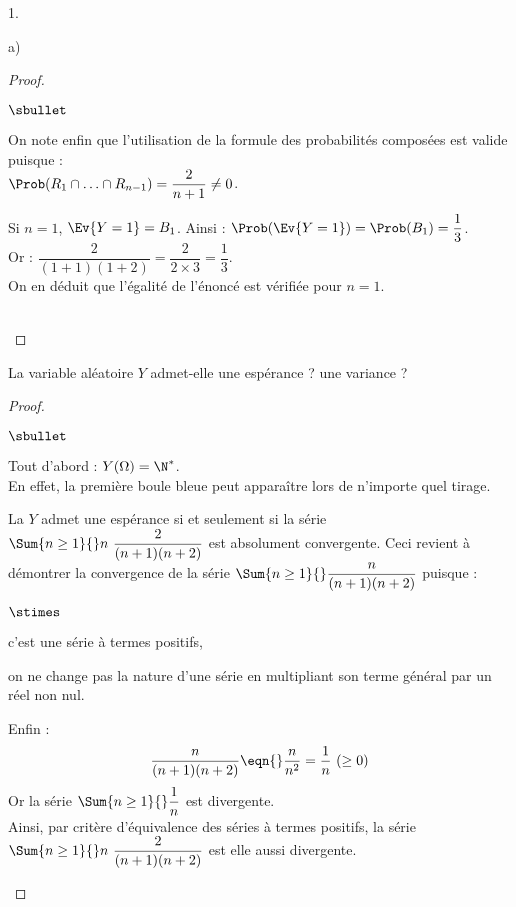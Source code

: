 \begin{noliste}{1.}
\begin{noliste}{a)}
\begin{proof}
\begin{noliste}{$\sbullet$}
      \item On note enfin que l'utilisation de la formule des
        probabilités composées est valide puisque : \\[.1cm]
        $\Prob(R_1 \cap
        \ldots \cap R_{n-1}) = \dfrac{2}{n+1} \neq 0$.
        
       \item Si $n = 1$, $\Ev{Y = 1} = B_1$. Ainsi : $\Prob(\Ev{Y = 1})
        = \Prob(B_1) = \dfrac{1}{3}$.\\
        Or : $\dfrac{2}{(1+1)(1+2)} = \dfrac{2}{2 \times 3} =
        \dfrac{1}{3}$.\\[.2cm]
        On en déduit que l'égalité de l'énoncé est vérifiée pour $n =
        1$.
      \end{noliste}
      ~\\[-1cm]
    \end{proof}


    \newpage


  \item La variable aléatoire $Y$ admet-elle une espérance ? une
    variance ?
    
    \begin{proof}~
      \begin{noliste}{$\sbullet$}
      \item Tout d'abord : $Y(\Omega) = \N^*$.\\
        En effet, la première boule bleue peut apparaître lors de
        n'importe quel tirage.
      \item La \var $Y$ admet une espérance si et seulement si la
        série $\Sum{n \geq 1}{} n \ \dfrac{2}{(n+1)(n+2)}$ est
        absolument convergente. Ceci revient à démontrer la
        convergence de la série $\Sum{n \geq 1}{}
        \dfrac{n}{(n+1)(n+2)}$ puisque :
        \begin{noliste}{$\stimes$}
        \item c'est une série à termes positifs,
        \item on ne change pas la nature d'une série en multipliant
          son terme général par un réel non nul.
        \end{noliste}

      \item Enfin :
        \[
        \dfrac{n}{(n+1)(n+2)} \eqn{} \dfrac{n}{n^2} = \dfrac{1}{n} \
        (\geq 0)
        \]
        Or la série $\Sum{n \geq 1}{} \dfrac{1}{n}$ est divergente.\\
        Ainsi, par critère d'équivalence des séries à termes positifs,
        la série $\Sum{n \geq 1}{} n \ \dfrac{2}{(n+1)(n+2)}$ est elle
        aussi divergente.  %
        

\end{noliste}
\end{proof}
\end{noliste}
\end{noliste}
